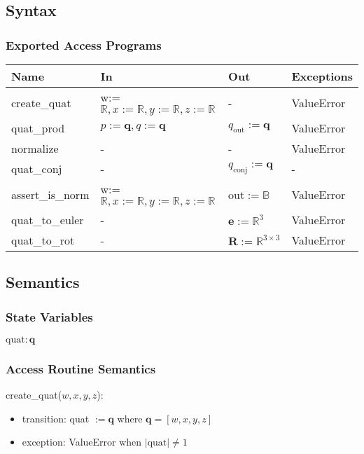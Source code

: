 \documentclass[12pt, titlepage]{article}
\begin{document}
\subsection{Syntax}

\subsubsection{Exported Access Programs}

\begin{center}
\begin{tabular}{p{2.5cm} p{5.5cm} p{2cm} p{2cm}}
\hline
\textbf{Name} & \textbf{In} & \textbf{Out} & \textbf{Exceptions} \\
\hline
create\_quat & w:=$\mathbb{R}, x:=\mathbb{R}, y:=\mathbb{R}, z:=\mathbb{R}$ & - & ValueError \\
quat\_prod & $p:=\mathbf{q},  q:=\mathbf{q}$ & $q_\text{out}:=\mathbf{q}$ & ValueError \\
normalize & - & - & ValueError \\
quat\_conj & - & $q_\text{conj}:= \mathbf{q}$ & - \\
assert\_is\_norm & w:=$\mathbb{R}, x:=\mathbb{R}, y:=\mathbb{R}, z:=\mathbb{R}$ & out$:=\mathbb{B}$
& ValueError \\
quat\_to\_euler & - & $\mathbf{e}:=\mathbb{R}^3$ & ValueError \\
quat\_to\_rot & - & $\mathbf{R} := \mathbb{R}^{3 \times 3}$ & ValueError \\
\hline
\end{tabular}
\end{center}

\subsection{Semantics}

\subsubsection{State Variables}

$\text{quat}: \mathbf{q}$

\subsubsection{Access Routine Semantics}

\noindent create\_quat($w, x, y, z$):
\begin{itemize}
\item transition: quat $:= \mathbf{q}$ where $\mathbf{q} = [w, x, y, z]$
\item exception: ValueError when  $|\text{quat}| \neq 1$
\end{itemize}
\end{document}

